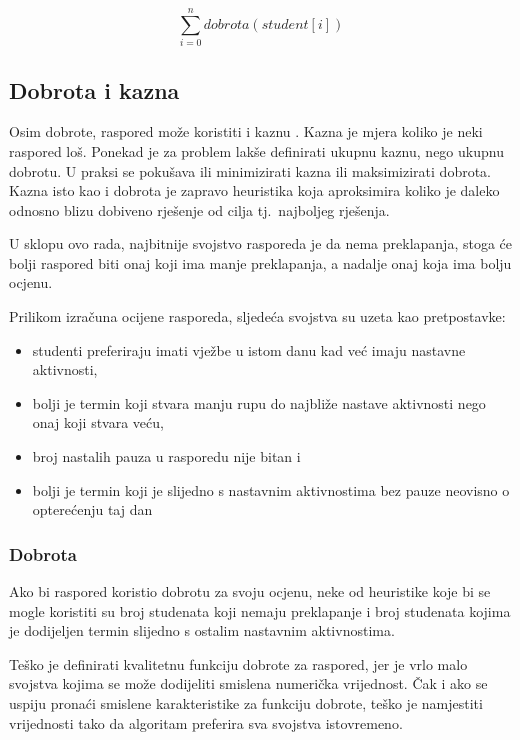\documentclass[times, utf8, zavrsni]{fer}
\begin{document}
\begin{equation}
\sum_{i=0}^{n} dobrota(student[i])
\label{eq:dobrota}
\end{equation}

\subsection{Dobrota i kazna}

Osim dobrote, raspored može koristiti i kaznu . Kazna je mjera koliko je neki raspored loš. Ponekad je za problem lakše definirati ukupnu kaznu, nego ukupnu dobrotu. U praksi se pokušava ili minimizirati kazna ili maksimizirati dobrota. Kazna isto kao i dobrota je zapravo heuristika koja aproksimira koliko je daleko odnosno blizu dobiveno rješenje od cilja tj.\ najboljeg rješenja.

U sklopu ovo rada, najbitnije svojstvo rasporeda je da nema preklapanja, stoga će bolji raspored biti onaj koji ima manje preklapanja, a nadalje onaj koja ima bolju ocjenu.

Prilikom izračuna ocijene rasporeda, sljedeća svojstva su uzeta kao pretpostavke:

\begin{itemize}
	\item studenti preferiraju imati vježbe u istom danu kad već imaju nastavne aktivnosti,
	\item bolji je termin koji stvara manju rupu do najbliže nastave aktivnosti nego onaj koji stvara veću,
	\item broj nastalih pauza u rasporedu nije bitan i 
	\item bolji je termin koji je slijedno s nastavnim aktivnostima bez pauze neovisno o opterećenju taj dan
\end{itemize}

\subsubsection{Dobrota}

Ako bi raspored koristio dobrotu za svoju ocjenu, neke od heuristike koje bi se mogle koristiti su broj studenata koji nemaju preklapanje i broj studenata kojima je dodijeljen termin slijedno s ostalim nastavnim aktivnostima.

Teško je definirati kvalitetnu funkciju dobrote za raspored, jer je vrlo malo svojstva kojima se može dodijeliti smislena numerička vrijednost. Čak i ako se uspiju pronaći smislene karakteristike za funkciju dobrote, teško je namjestiti vrijednosti tako da algoritam preferira sva svojstva istovremeno.
\end{document}
